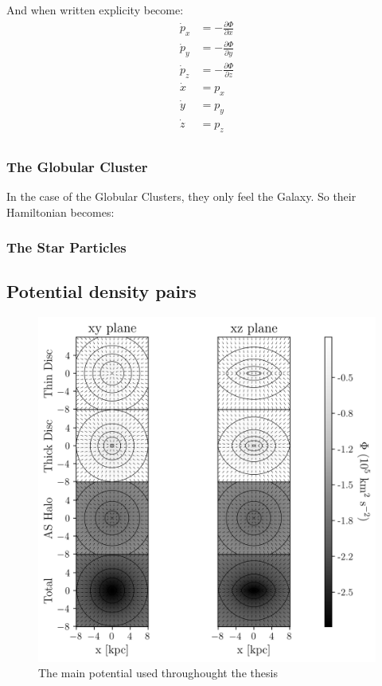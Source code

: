         And when written explicity become: 
        \begin{align}
            \dot{p}_x &= -\frac{\partial \Phi}{\partial x} \\
            \dot{p}_y &= -\frac{\partial \Phi}{\partial y} \\
            \dot{p}_z &= -\frac{\partial \Phi}{\partial z} \\
            \dot{x} &= p_x \\ 
            \dot{y} &= p_y \\ 
            \dot{z} &= p_z \\ 
        \end{align}        


        \subsubsection*{The Globular Cluster}
            In the case of the Globular Clusters, they only feel the Galaxy. So their Hamiltonian becomes: 


        \subsubsection*{The Star Particles}

    \subsection{Potential density pairs}

        \begin{figure}
            \centering
            \includegraphics[width=\linewidth]{images/figure_pouliasis2017pii_potential_-8_8.png}
            \caption{The main potential used throughought the thesis}
        \end{figure}        
    

